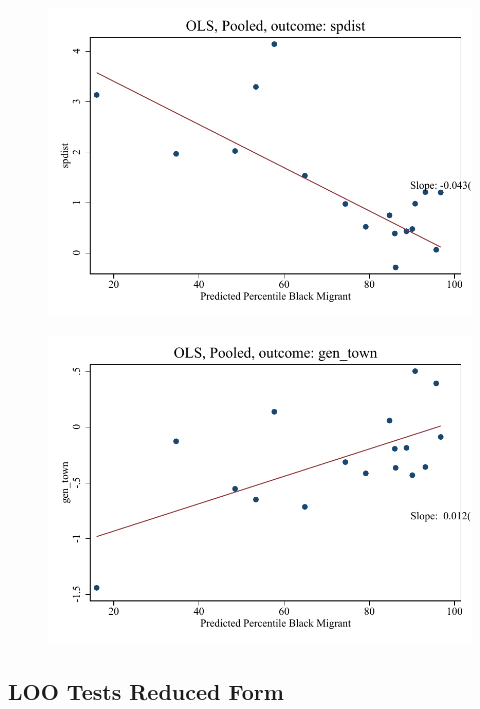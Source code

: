 \documentclass{article}
\begin{document}
\clearpage
\begin{figure}
	\centering
	\includegraphics[width=.8\textwidth]{figures/binscatter/pooled_spdist_ols_percentile.pdf}
\end{figure}
\clearpage
\begin{figure}
	\centering
	\includegraphics[width=.8\textwidth]{figures/binscatter/pooled_gen_town_ols_percentile.pdf}
\end{figure}
\clearpage
\subsection{LOO Tests Reduced Form}
\clearpage
\end{document}
